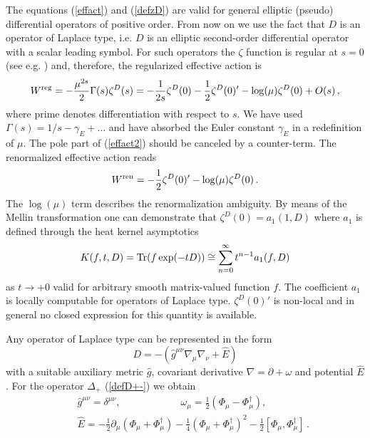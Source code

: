 \documentclass[a4paper,12pt]{article}
\begin{document}
The equations (\ref{effact}) and (\ref{defzD}) are valid for
general elliptic (pseudo) differential operators of positive
order. From now on we use the fact that $D$ is an operator of
Laplace type, i.e. $D$ is an elliptic second-order differential
operator with a scalar leading symbol. For such operators the
$\zeta$ function is regular at $s=0$ (see e.g. \cite{Gilkey95}) 
and, therefore, the regularized effective action is
\begin{equation}
W^{\mbox{\scriptsize reg}}=-\frac{\mu^{2s}}{2} {\Gamma (s)}
\zeta^D (s)= -\frac 1{2s} \zeta^D(0) -\frac 12 \zeta^D(0)'
-\log (\mu ) \zeta^D(0) +O(s) \,,
\label{effact2}
\end{equation}
where prime denotes differentiation with respect to $s$.
We have used $\Gamma (s) =1/s -\gamma_E +\dots $ and
have absorbed the Euler constant $\gamma_E$ in a redefinition
of $\mu$. The pole part of (\ref{effact2}) should be
canceled by a counter-term. The renormalized effective
action reads
\begin{equation}
W^{\mbox{\scriptsize ren}}=-\frac 12 \zeta^D(0)'
-\log (\mu ) \zeta^D(0) \,. \label{renea}
\end{equation}
The $\log (\mu )$ term describes the renormalization
ambiguity. By means of the Mellin transformation
one can demonstrate that $\zeta^D(0)=a_1(1,D)$ where
$a_1$ is defined through the heat kernel 
asymptotics 
\begin{equation}
K(f,t,D)={\rm Tr}(f\exp (-tD))
\cong \sum_{n=0}^\infty t^{n-1} a_1 (f,D)
\label{hkD}
\end{equation}
as $t\to +0$ valid for arbitrary smooth matrix-valued
function $f$.
The coefficient $a_1$ is locally computable for operators
of Laplace type. $\zeta^D(0)'$ is non-local and in general
no closed expression for this quantity is available.

Any operator of Laplace type can be represented
in the form
\begin{equation}
D=-(\hat g^{\mu\nu}\nabla_\mu \nabla_\nu +\hat E)
\label{canform}
\end{equation}
with a suitable auxiliary metric $\hat g$,
covariant derivative $\nabla =\partial +\omega$
and potential $\hat E$. For the operator $\Delta_+$
(\ref{defD+-}) we obtain
\begin{eqnarray}
&&\hat g^{\mu\nu}=\delta^{\mu\nu},\qquad \qquad \qquad 
\omega_\mu =\frac 12 \left( \Phi_\mu -\Phi_\mu^\dag \right),
\nonumber \\
&&\hat E =-\frac 12 \partial_\mu 
\left( \Phi_\mu +\Phi_\mu^\dag \right)
-\frac 14 \left( \Phi_\mu +\Phi_\mu^\dag \right)^2 
-\frac 12 [\Phi_\mu ,\Phi_\mu^\dag ] \label{E+}\,.
\end{eqnarray}
\end{document}
